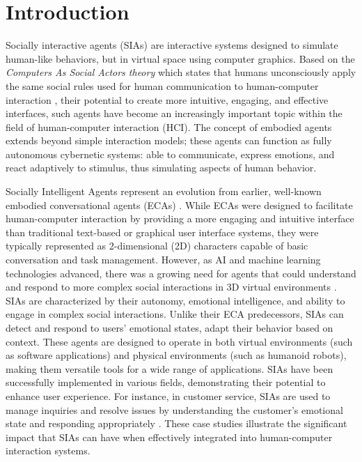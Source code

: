 \documentclass[12pt]{article}
\begin{document}
\newpage

\section{Introduction}

Socially interactive agents (SIAs)\cite{Gratch2021SIArapport} are interactive systems designed to simulate human-like behaviors, but in virtual space using computer graphics.
Based on the {\em Computers As Social Actors   theory} which states that humans unconsciously apply the same social rules used for human communication to human-computer interaction \cite{Nass1996}, their potential to create more intuitive, engaging, and effective interfaces, such agents have become an increasingly important topic within the field of human-computer interaction (HCI).  The concept of embodied agents extends beyond simple interaction models; these agents can function as fully autonomous cybernetic systems: able to communicate, express emotions, and react adaptively to stimulus, thus simulating aspects of human behavior.  

{Socially Intelligent Agents} represent an evolution from earlier, well-known embodied conversational agents (ECAs) \cite{Cassell2000}.  While ECAs were designed to facilitate human-computer interaction by providing a more engaging and intuitive interface than traditional text-based or graphical user interface  systems, they were typically represented as 2-dimensional (2D)  characters capable of basic conversation and task management. However, as AI and machine learning technologies advanced, there was a growing need for agents that could understand and respond to more complex social interactions in 3D virtual environments \cite{Gratch2021SIArapport}.
SIAs are characterized by their autonomy, emotional intelligence, and ability to engage in complex social interactions. Unlike their ECA predecessors, SIAs can detect and respond to users' emotional states, adapt their behavior based on context. These agents are designed to operate in both virtual environments (such as software applications) and physical environments (such as humanoid robots), making them versatile tools for a wide range of applications.
SIAs have been successfully implemented in various fields, demonstrating their potential to enhance user experience. For instance, in customer service, SIAs are used to manage inquiries and resolve issues by understanding the customer's emotional state and responding appropriately \cite{Gratch2021SIArapport}.  These case studies illustrate the significant impact that SIAs can have when effectively integrated into human-computer interaction systems.
\end{document}
